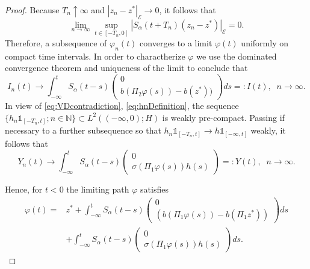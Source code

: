 \documentclass[10pt, reqno]{amsart}
\newcommand{\N}{\mathbb{N}}
\newcommand{\e}{\mathcal{E}}
\theoremstyle{definition}
\numberwithin{lem}{section}
\numberwithin{cor}{section}
\numberwithin{prop}{section}
\numberwithin{thm}{section}
\numberwithin{dfn}{section}
\begin{document}
\begin{proof}
Because $T_n \uparrow \infty$ and $|z_n - z^*|_\e \to 0$, it follows that
\[\lim_{n \to \infty}\sup_{t\in [-T_n,0]} |S_\alpha(t + T_n)(z_n - z^*)|_\e = 0.\]
Therefore, a subsequence of  $\varphi_n(t)$ converges  to a limit $\varphi(t)$ uniformly on compact time intervals. In order to charactherize $\varphi$ we use the dominated convergence theorem and uniqueness of the limit to conclude that
\begin{equation*}
    I_n(t) \longrightarrow \int_{-\infty}^t S_\alpha(t-s) \begin{pmatrix}
        0 \\ b(\Pi_2 \varphi(s)) - b(z^*))
    \end{pmatrix}ds=:I(t),\;\;n\to\infty.
\end{equation*}
In view of \eqref{eq:VDcontradiction}, \eqref{eq:hnDefinition}, the sequence $\{h_n\mathds{1}_{[-T_n,t]};n\in\N\}\subset L^2((-\infty, 0);H)$ is weakly pre-compact. Passing if necessary to a further subsequence so that  $h_n\mathds{1}_{[-T_n,t]} \rightarrow h\mathds{1}_{[-\infty,t]}$ weakly, it follows that 
\begin{equation*}
    Y_n(t) \longrightarrow \int_{-\infty}^t S_\alpha(t-s) \begin{pmatrix}
        0 \\ \sigma( \Pi_1 \varphi(s))h(s)
    \end{pmatrix}=:Y(t),\;\;n\to\infty.
\end{equation*}

Hence, for $t<0$ the limiting path $\varphi$ satisfies
\begin{align}\label{eq:varphi-infinite-integrals}
    \varphi(t) = &z^* + \int_{-\infty}^t S_\alpha(t-s) \begin{pmatrix} 0 \\ (b(\Pi_1\varphi(s)) - b(\Pi_1 z^*)) \end{pmatrix} ds \nonumber\\&+ \int_{-\infty}^t S_\alpha(t-s) \begin{pmatrix} 0 \\ \sigma(\Pi_1 \varphi(s))h(s) \end{pmatrix} ds.
\end{align}



\end{proof}
\end{document}

